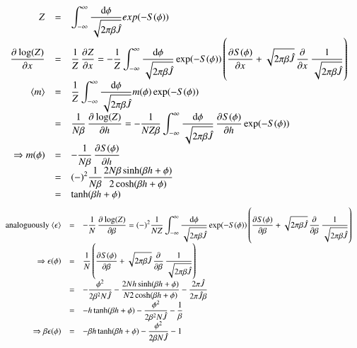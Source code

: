 \documentclass{scrartcl}
\begin{document}
\[\begin{array}{>{\displaystyle}r>{\displaystyle}c>{\displaystyle}l}

Z&=&\int_{-\infty}^{\infty}\frac{\mathrm{d} \phi}{\sqrt{2\pi\beta\hat{J}}}exp(-S(\phi))\\


\dpd{\log(Z)}{x}&=&\frac{1}{Z}\dpd{Z}{x}=
-\frac{1}{Z}\int_{-\infty}^{\infty}\frac{\mathrm{d} \phi}{\sqrt{2\pi\beta\hat{J}}}\exp(-S(\phi))\left( \dpd{S(\phi)}{x}+\sqrt{2\pi\beta\hat{J}}\dpd{}{x}\frac{1}{\sqrt{2\pi\beta\hat{J}}}\right) \\

\langle m\rangle&=&\frac{1}{Z}\int_{-\infty}^{\infty}\frac{\mathrm{d} \phi}{\sqrt{2\pi\beta\hat{J}}}m(\phi)\exp(-S(\phi))\\
&=&\frac{1}{N\beta}\dpd{\log(Z)}{h}=
-\frac{1}{NZ\beta}\int_{-\infty}^{\infty}\frac{\mathrm{d} \phi}{\sqrt{2\pi\beta\hat{J}}}\dpd{S(\phi)}{h}\exp(-S(\phi))\\

\Rightarrow m(\phi)&=&-\frac{1}{N\beta}\dpd{S(\phi)}{h}\\
&=&(-)^2\frac{1}{N\beta}\frac{2N\beta\sinh(\beta h+\phi)}{2\cosh(\beta h+\phi)}\\
&=&\tanh(\beta h+\phi)\\


\end{array}\]
\[\begin{array}{>{\displaystyle}r>{\displaystyle}c>{\displaystyle}l}

\text{analoguously } \langle \epsilon\rangle&=&-\frac{1}{N}\dpd{\log(Z)}{\beta}=
(-)^2\frac{1}{NZ}\int_{-\infty}^{\infty}\frac{\mathrm{d} \phi}{\sqrt{2\pi\beta\hat{J}}}\exp(-S(\phi))
\left( \dpd{S(\phi)}{\beta}+\sqrt{2\pi\beta\hat{J}}\dpd{}{\beta}\frac{1}{\sqrt{2\pi\beta\hat{J}}}\right)\\

\Rightarrow \epsilon(\phi)&=&\frac{1}{N}\left( \dpd{S(\phi)}{\beta}+\sqrt{2\pi\beta\hat{J}}\dpd{}{\beta}\frac{1}{\sqrt{2\pi\beta\hat{J}}}\right)\\
&=&-\frac{\phi^2}{2\beta^2 N\hat{J}}-\frac{2Nh\sinh(\beta h+\phi)}{N2\cosh(\beta h+\phi)}-\frac{2\pi\hat{J}}{2\pi\hat{J}\beta}\\

&=&-h\tanh(\beta h+\phi)-\frac{\phi^2}{2\beta^2 N\hat{J}}-\frac{1}{\beta}\\

\Rightarrow \beta\epsilon(\phi)&=&-\beta h\tanh(\beta h+\phi)-\frac{\phi^2}{2\beta N\hat{J}}-1\\

\end{array}\]
\end{document}
